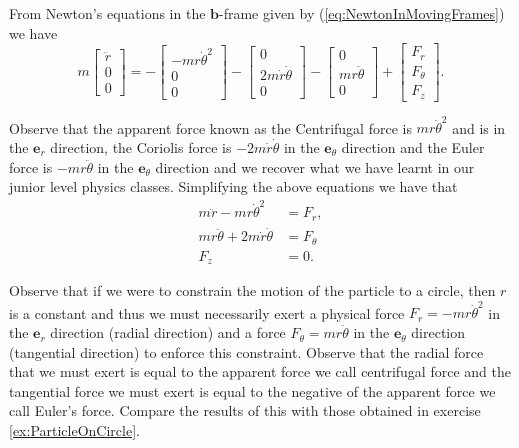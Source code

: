 \documentclass[graybox,envcountchap,sectrefs]{svmonoMuga}
\begin{document}
From Newton's equations in the $\mathbf{b}$-frame given by (\ref{eq:NewtonInMovingFrames}) we have
\[
m\left[\begin{array}{c} \ddot{r}\\
0\\ 0\end{array} \right]=-\left[\begin{array}{c} -m r\dot{\theta}^2\\
0 \\ 0\end{array} \right]-
 \left[\begin{array}{r} 0\\
2m\dot{r}\dot{\theta}\\ 0\end{array} \right]-
  \left[\begin{array}{c} 0\\
mr\ddot{\theta}\\ 0\end{array} \right]
+\left[\begin{array}{c}F_{r}\\
{F}_{\theta}\\ F_z\end{array} \right].
\]


Observe that the apparent force known as the Centrifugal force is $mr\dot{\theta}^2$ and is in the $\mathbf{e}_r$ direction, the Coriolis force is $-2m\dot{r}\dot{\theta} $ in the $\mathbf{e}_{\theta}$ direction and the Euler force is $-mr\ddot{\theta}$ in the $\mathbf{e}_{\theta}$ direction and we recover what we have learnt in our junior level physics classes.
Simplifying the above equations we have that
\begin{align*}
m\ddot{r} - mr\dot{\theta}^2&= F_r, \\
mr\ddot{\theta} +2m\dot{r}\dot{\theta}&= F_{\theta}\\
F_z &= 0.
\end{align*}

Observe that if we were to constrain the motion of the particle to a circle, then $r$ is a constant and thus we must necessarily exert a physical force $F_r=-mr\dot{\theta}^2$ in the $\mathbf{e}_r$ direction (radial direction) and a force 
$F_{\theta}=mr\ddot{\theta}$ in the $\mathbf{e}_\theta$ direction (tangential direction)  to enforce this constraint.
Observe that the radial force that we must exert is equal to the apparent force we call centrifugal force and the tangential force we must exert is equal to the negative of the apparent force we call Euler's force.
Compare the results of this with those obtained in exercise \ref{ex:ParticleOnCircle}.
\end{document}
